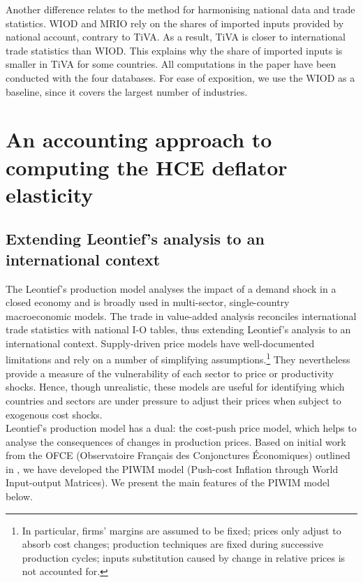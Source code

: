 \documentclass[11pt,a4paper]{paper} %
\begin{document}
Another difference relates to the method for harmonising national data and trade statistics. WIOD and MRIO rely on the shares of imported inputs provided by national account, contrary to TiVA. As a result, TiVA is closer to international trade statistics than WIOD. This explains why the share of imported inputs is smaller in TiVA for some countries.
All computations in the paper have been conducted with the four databases.
For ease of exposition, we use the WIOD as a baseline, since it covers the largest number of industries.

\section{An accounting approach to computing the HCE deflator elasticity}
\label{sec:metho}

\subsection{Extending Leontief's analysis to an international context}\label{subsec:leontief}

The Leontief's production model analyses the impact of a demand shock in a closed economy \citep{Leontief1951} and is broadly used in multi-sector, single-country macroeconomic models. 
The trade in value-added analysis reconciles international trade statistics with national I-O tables, thus extending Leontief's analysis to an international context.
Supply-driven price models have well-documented limitations \citep{Folloni1994} and rely on a number of simplifying assumptions.\footnote{In particular, firms' margins are assumed to be fixed; prices only adjust to absorb cost changes; production techniques are fixed during successive production cycles; inputs substitution caused by change in relative prices is not accounted for.}
They nevertheless provide a measure of the vulnerability of each sector to price or productivity shocks. 
Hence, though unrealistic, these models are useful for identifying which countries and sectors are under pressure to adjust their prices when subject to exogenous cost shocks.\\ 
Leontief's production model has a dual: the cost-push price model, which helps to analyse the consequences of changes in production prices.
Based on initial work from the OFCE (Observatoire Français des Conjonctures Économiques) outlined in \cite{Cochard2016}, we have developed the PIWIM model (Push-cost Inflation through World Input-output Matrices). We present the main features of the PIWIM model below. 
\end{document}

